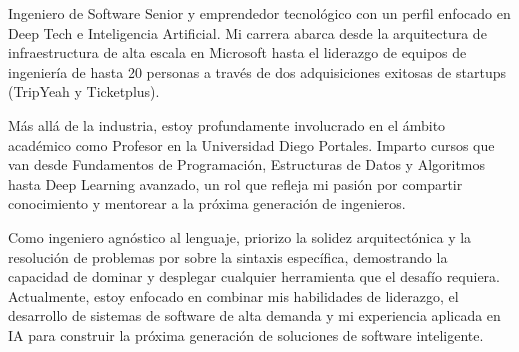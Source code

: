 

\begin{cvparagraph}
Ingeniero de Software Senior y emprendedor tecnológico con un perfil enfocado en Deep Tech e Inteligencia Artificial. Mi carrera abarca desde la arquitectura de infraestructura de alta escala en Microsoft hasta el liderazgo de equipos de ingeniería de hasta 20 personas a través de dos adquisiciones exitosas de startups (TripYeah y Ticketplus).

Más allá de la industria, estoy profundamente involucrado en el ámbito académico como Profesor en la Universidad Diego Portales. Imparto cursos que van desde Fundamentos de Programación, Estructuras de Datos y Algoritmos hasta Deep Learning avanzado, un rol que refleja mi pasión por compartir conocimiento y mentorear a la próxima generación de ingenieros.

Como ingeniero agnóstico al lenguaje, priorizo la solidez arquitectónica y la resolución de problemas por sobre la sintaxis específica, demostrando la capacidad de dominar y desplegar cualquier herramienta que el desafío requiera. Actualmente, estoy enfocado en combinar mis habilidades de liderazgo, el desarrollo de sistemas de software de alta demanda y mi experiencia aplicada en IA para construir la próxima generación de soluciones de software inteligente.

\end{cvparagraph}
